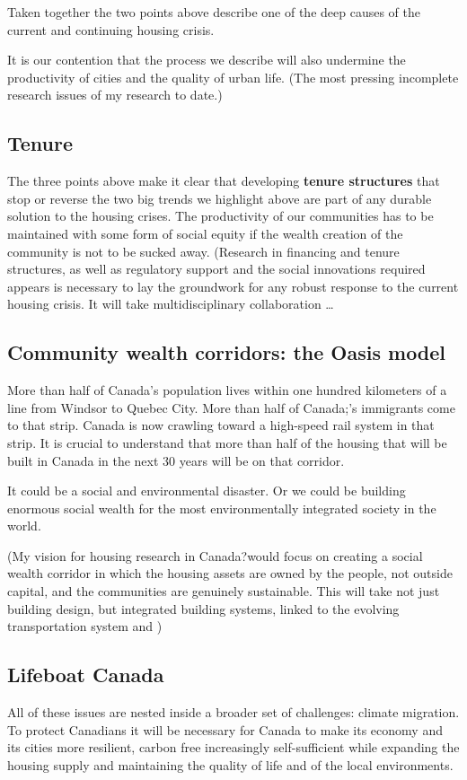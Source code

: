 Taken together the two points above describe  one of the deep causes of the current and continuing housing crisis.

It is our contention that the process we describe will also undermine the productivity of cities and the quality of urban life. {\color{red}(The most pressing incomplete research issues of my research to date.)} 



\subsection{Tenure}
The three points above make  it clear that developing \textbf{tenure structures} that stop or reverse the two big trends we highlight above are part of any durable solution to the housing crises. The productivity of our communities has to be maintained with some form of social equity if the wealth creation of the community is not to be sucked away.     {\color{red}(Research in financing and tenure structures, as well as regulatory support and the social innovations required appears is necessary to lay the groundwork for any robust response to the current housing crisis. It will take  multidisciplinary collaboration  \dots}

\subsection{Community wealth corridors: the Oasis model}
More than half of Canada's population lives within  one hundred kilometers of a line from Windsor to Quebec City. More than half of Canada;'s immigrants come to that strip. Canada is now crawling toward a high-speed rail system in that strip. It is crucial to understand that more than half of the housing that will be built in Canada in the next 30 years will be on that corridor. 

It could be a social and environmental disaster. Or we could be building enormous social wealth for the most environmentally integrated society in the  world. 
    
        {\color{red}(My vision for housing research in Canada?would focus on creating a social wealth corridor in which the housing assets are owned by the people, not outside capital, and the communities are genuinely sustainable. This will take not just building design, but integrated building systems, linked to the evolving transportation system and )}

 \subsection{Lifeboat Canada}
 All of these issues are nested inside a broader set of challenges: climate migration. To protect Canadians it will be necessary for Canada to make its economy and its cities more resilient, carbon free  increasingly self-sufficient while expanding the housing supply and  maintaining the quality of life and of the local environments. 
 
